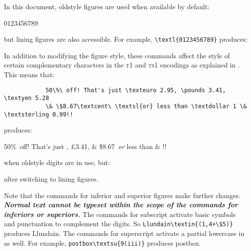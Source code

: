 \documentclass[11pt,british]{article}
\begin{document}
	In this document, oldstyle figures are used when available by default:
		\begin{center}
			0123456789
		\end{center}
	but lining figures are also accessible. For example, \verb|\textl{0123456789}| produces:
		\begin{center}
		\end{center}
	In addition to modifying the figure style, these commands affect the style of certain complementary characters in the \textsc{t1} and \textsc{ts1} encodings as explained in . This means that:
		\begin{verbatim}
			50\%\ off! That's just \texteuro 2.95, \pounds 3.41, \textyen 5.28 
			\& \$8.67\textcent\ \textsl{or} less than \textdollar 1 \& \textsterling 0.99!!
		\end{verbatim}
	 produces:
		\begin{center}
			50\%\ off! That's just , \pounds 3.41, 
			\& \$8.67\textcent\ \textsl{or} less than  \& !!
		\end{center}
		when oldstyle digits are in use, but:
		\begin{center}
		\end{center}
		after switching to lining figures.
		
	Note that the commands for inferior and superior figures make further changes. \textbf{\emph{Normal text cannot be typeset within the scope of the commands for inferiors or superiors.}} The commands for subscript activate basic symbols and punctuation to complement the digits. So \verb|Llundain\textin{(1,4+\$5)}| produces Llundain. The commands for superscript activate a partial lowercase in as well. For example, \verb|postbox| produces postbox\textsu{9(iii)}.
		
%
	
\end{document}
